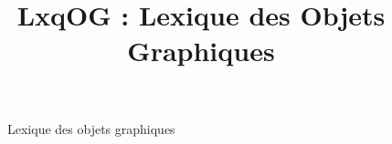 

\usepackage{longtable}

\title{LxqOG : Lexique des Objets Graphiques}
\date{}


\maketitle

\begin{figure}[h!]
\begin{center}
    
\end{center}
\caption{Lexique des objets graphiques}
\end{figure}


